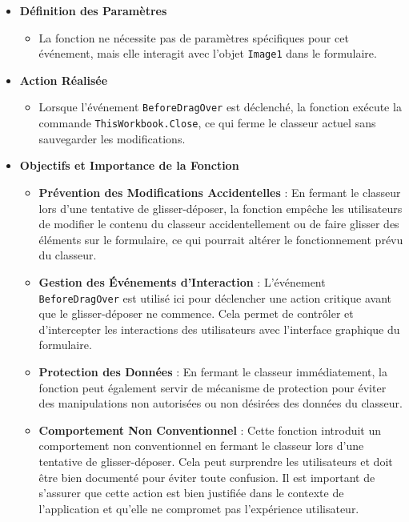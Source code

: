 \documentclass[a4paper, oneside, 12pt, final]{extreport}
\begin{document}
\begin{itemize}
    \item \textbf{Définition des Paramètres}
    \begin{itemize}
        \item La fonction ne nécessite pas de paramètres spécifiques pour cet événement, mais elle interagit avec l'objet \texttt{Image1} dans le formulaire.
    \end{itemize}

    \item \textbf{Action Réalisée}
    \begin{itemize}
        \item Lorsque l'événement \texttt{BeforeDragOver} est déclenché, la fonction exécute la commande \texttt{ThisWorkbook.Close}, ce qui ferme le classeur actuel sans sauvegarder les modifications.
    \end{itemize}

    \item \textbf{Objectifs et Importance de la Fonction}
    \begin{itemize}
        \item \textbf{Prévention des Modifications Accidentelles} : En fermant le classeur lors d'une tentative de glisser-déposer, la fonction empêche les utilisateurs de modifier le contenu du classeur accidentellement ou de faire glisser des éléments sur le formulaire, ce qui pourrait altérer le fonctionnement prévu du classeur.
        \item \textbf{Gestion des Événements d'Interaction} : L'événement \texttt{BeforeDragOver} est utilisé ici pour déclencher une action critique avant que le glisser-déposer ne commence. Cela permet de contrôler et d'intercepter les interactions des utilisateurs avec l'interface graphique du formulaire.
        \item \textbf{Protection des Données} : En fermant le classeur immédiatement, la fonction peut également servir de mécanisme de protection pour éviter des manipulations non autorisées ou non désirées des données du classeur.
        \item \textbf{Comportement Non Conventionnel} : Cette fonction introduit un comportement non conventionnel en fermant le classeur lors d'une tentative de glisser-déposer. Cela peut surprendre les utilisateurs et doit être bien documenté pour éviter toute confusion. Il est important de s'assurer que cette action est bien justifiée dans le contexte de l'application et qu'elle ne compromet pas l'expérience utilisateur.
    \end{itemize}
\end{itemize}
\end{document}
